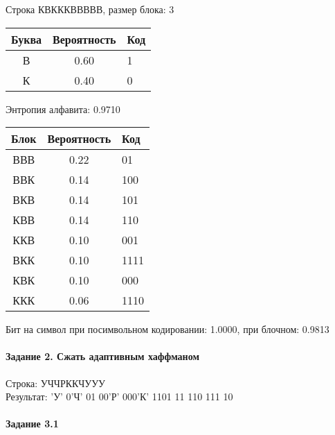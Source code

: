 \documentclass[a4paper, 12pt]{article}
\begin{document}
Строка КВКККВВВВВ, размер блока: 3
\begin{center}
 \begin{tabular}{ |c|c|l| } 
  \hline
     Буква & Вероятность & Код\\ \hline
В & 0.60 & 1\\\hline
К & 0.40 & 0
\\ \hline \end{tabular}
\end{center}
Энтропия алфавита: 0.9710
\begin{center}
 \begin{tabular}{ |c|c|l| } 
  \hline
     Блок & Вероятность & Код\\ \hline
ВВВ & 0.22 & 01\\\hline
ВВК & 0.14 & 100\\\hline
ВКВ & 0.14 & 101\\\hline
КВВ & 0.14 & 110\\\hline
ККВ & 0.10 & 001\\\hline
ВКК & 0.10 & 1111\\\hline
КВК & 0.10 & 000\\\hline
ККК & 0.06 & 1110
\\ \hline \end{tabular}
\end{center}
Бит на символ при посимвольном кодировании: 1.0000, при блочном: 0.9813


\pagebreak
\paragraph{Задание 2. Сжать адаптивным хаффманом\\}

Строка: 
УЧЧРККЧУУУ\\
Результат: 'У' 0'Ч' 01 00'Р' 000'К' 1101 11 110 111 10










\pagebreak
\paragraph{Задание 3.1}
\end{document}
